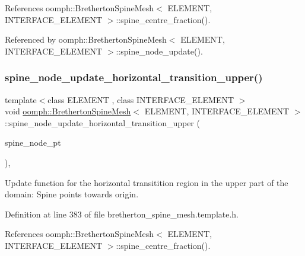 References oomph\+::\+Bretherton\+Spine\+Mesh$<$ E\+L\+E\+M\+E\+N\+T, I\+N\+T\+E\+R\+F\+A\+C\+E\+\_\+\+E\+L\+E\+M\+E\+N\+T $>$\+::spine\+\_\+centre\+\_\+fraction().



Referenced by oomph\+::\+Bretherton\+Spine\+Mesh$<$ E\+L\+E\+M\+E\+N\+T, I\+N\+T\+E\+R\+F\+A\+C\+E\+\_\+\+E\+L\+E\+M\+E\+N\+T $>$\+::spine\+\_\+node\+\_\+update().

\mbox{\label{classoomph_1_1BrethertonSpineMesh_aa9fa4941d8fb02a388e933a7dd1c76a2}} 
\subsubsection{\texorpdfstring{spine\+\_\+node\+\_\+update\+\_\+horizontal\+\_\+transition\+\_\+upper()}{spine\_node\_update\_horizontal\_transition\_upper()}}
{\footnotesize\ttfamily template$<$class E\+L\+E\+M\+E\+NT , class I\+N\+T\+E\+R\+F\+A\+C\+E\+\_\+\+E\+L\+E\+M\+E\+NT $>$ \\
void \hyperlink{classoomph_1_1BrethertonSpineMesh}{oomph\+::\+Bretherton\+Spine\+Mesh}$<$ E\+L\+E\+M\+E\+NT, I\+N\+T\+E\+R\+F\+A\+C\+E\+\_\+\+E\+L\+E\+M\+E\+NT $>$\+::spine\+\_\+node\+\_\+update\+\_\+horizontal\+\_\+transition\+\_\+upper (\begin{DoxyParamCaption}\item[{Spine\+Node $\ast$}]{spine\+\_\+node\+\_\+pt }\end{DoxyParamCaption})\hspace{0.3cm}{\ttfamily [inline]}, {\ttfamily [protected]}}



Update function for the horizontal transitition region in the upper part of the domain\+: Spine points towards origin. 



Definition at line 383 of file bretherton\+\_\+spine\+\_\+mesh.\+template.\+h.



References oomph\+::\+Bretherton\+Spine\+Mesh$<$ E\+L\+E\+M\+E\+N\+T, I\+N\+T\+E\+R\+F\+A\+C\+E\+\_\+\+E\+L\+E\+M\+E\+N\+T $>$\+::spine\+\_\+centre\+\_\+fraction().



